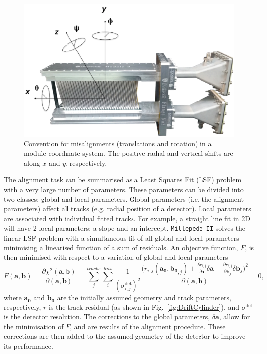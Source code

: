 \documentclass[12pt]{article}
\begin{document}
\begin{figure}[h!]
\centering
\includegraphics[width=0.6\linewidth]{fig/rotAxis.png}
\caption{Convention for misalignments (translations and rotation) in a module coordinate system. The positive radial and vertical shifts are along $x$ and $y$, respectively.}
\label{fig:Rotation}
\end{figure}

The alignment task can be summarised as a Least Squares Fit (LSF) problem with a very large number of parameters. These parameters can be divided into two classes: global and local parameters. Global parameters (i.e. the alignment parameters) affect all tracks (e.g. radial position of a detector). Local parameters are associated with individual fitted tracks. For example, a straight line fit in 2D will have 2 local parameters: a slope and an intercept. \texttt{Millepede-II} solves the linear LSF problem with a simultaneous fit of all global and local parameters minimising a linearised function of a sum of residuals. An objective function, $F$, is then minimised with respect to a variation of global and local parameters
\begin{equation}
\label{eq:obj_fun}
F(\boldsymbol{a},\boldsymbol{b})=\frac{\partial\chi^2(\boldsymbol{a},\boldsymbol{b})}{\partial(\boldsymbol{a},\boldsymbol{b})}=
\sum_{j}^{tracks}\sum_{i}^{hits} \frac{1}{(\sigma^{\mathrm{det}}_{i,j})^2} \frac{\big(r_{i,j}(\boldsymbol{a_0},\boldsymbol{b_0}_{,j})+\frac{\partial r_{i,j}}{\partial \boldsymbol{a}}
\delta \boldsymbol{a} +\frac{\partial r_{i,j}}{\partial \boldsymbol{b}_j}\delta \boldsymbol{b}_j\big)^2}{\partial(\boldsymbol{a},\boldsymbol{b})}=0,
\end{equation}
where $\boldsymbol{a_0}$ and $\boldsymbol{b_0}$ are the initially assumed geometry and track parameters, respectively, $r$ is the track residual (as shown in Fig.~\ref{fig:DriftCylinder}), and $\sigma^{\mathrm{det}}$ is the detector resolution. The corrections to the global parameters, $\delta\boldsymbol{a}$, allow for the minimisation of $F$, and are results of the alignment procedure. These corrections are then added to the assumed geometry of the detector to improve its performance.
\end{document}
